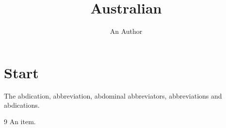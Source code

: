 \documentclass[australian]{report}
\title{Australian}
\author{An Author}
\begin{document}
\maketitle
\chapter{Start}
\begin{minipage}{60pt}
The abdication, abbreviation, abdominal abbreviators, abbreviations and abdications.
\end{minipage}
\begin{thebibliography}{9}
 An item.
\end{thebibliography}
\end{document}
